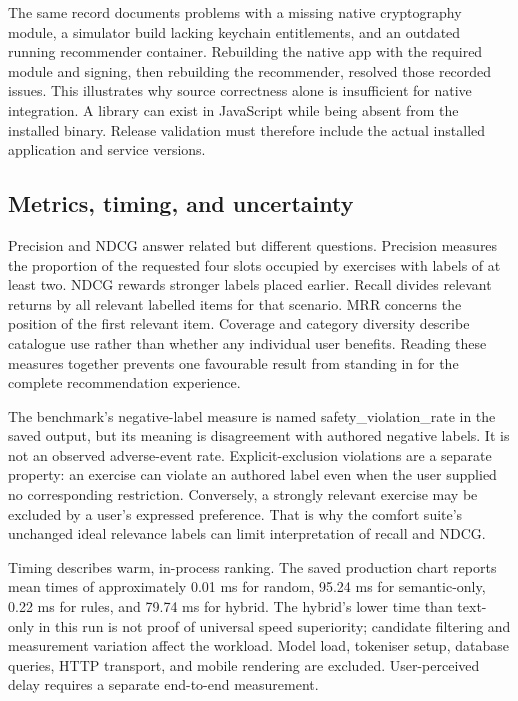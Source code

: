 The same record documents problems with a missing native cryptography module, a simulator build lacking keychain entitlements, and an outdated running recommender container. Rebuilding the native app with the required module and signing, then rebuilding the recommender, resolved those recorded issues. This illustrates why source correctness alone is insufficient for native integration. A library can exist in JavaScript while being absent from the installed binary. Release validation must therefore include the actual installed application and service versions.

\subsection{Metrics, timing, and uncertainty}

Precision and NDCG answer related but different questions. Precision measures the proportion of the requested four slots occupied by exercises with labels of at least two. NDCG rewards stronger labels placed earlier. Recall divides relevant returns by all relevant labelled items for that scenario. MRR concerns the position of the first relevant item. Coverage and category diversity describe catalogue use rather than whether any individual user benefits. Reading these measures together prevents one favourable result from standing in for the complete recommendation experience.

The benchmark's negative-label measure is named safety\_violation\_rate in the saved output, but its meaning is disagreement with authored negative labels. It is not an observed adverse-event rate. Explicit-exclusion violations are a separate property: an exercise can violate an authored label even when the user supplied no corresponding restriction. Conversely, a strongly relevant exercise may be excluded by a user's expressed preference. That is why the comfort suite's unchanged ideal relevance labels can limit interpretation of recall and NDCG.

Timing describes warm, in-process ranking. The saved production chart reports mean times of approximately 0.01 ms for random, 95.24 ms for semantic-only, 0.22 ms for rules, and 79.74 ms for hybrid. The hybrid's lower time than text-only in this run is not proof of universal speed superiority; candidate filtering and measurement variation affect the workload. Model load, tokeniser setup, database queries, HTTP transport, and mobile rendering are excluded. User-perceived delay requires a separate end-to-end measurement.

